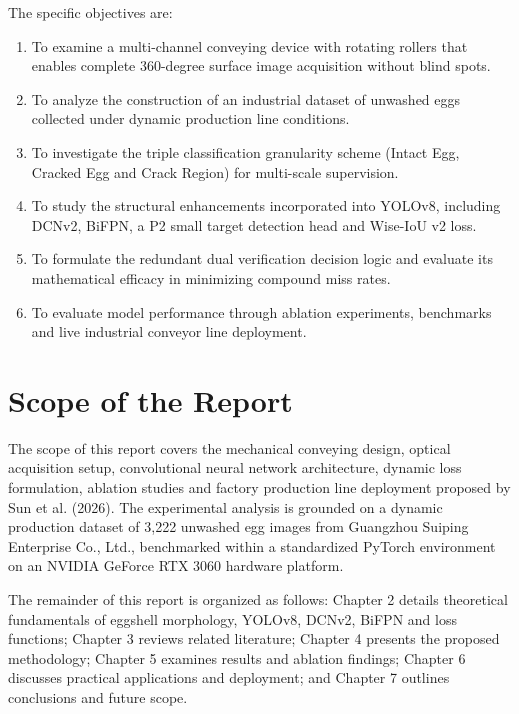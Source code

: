 \documentclass[12pt,a4paper]{report}
\begin{document}
The specific objectives are:
\begin{enumerate}[label=\arabic*.]
    \item To examine a multi-channel conveying device with rotating rollers that enables complete 360-degree surface image acquisition without blind spots.
    \item To analyze the construction of an industrial dataset of unwashed eggs collected under dynamic production line conditions.
    \item To investigate the triple classification granularity scheme (Intact Egg, Cracked Egg and Crack Region) for multi-scale supervision.
    \item To study the structural enhancements incorporated into YOLOv8, including DCNv2, BiFPN, a P2 small target detection head and Wise-IoU v2 loss.
    \item To formulate the redundant dual verification decision logic and evaluate its mathematical efficacy in minimizing compound miss rates.
    \item To evaluate model performance through ablation experiments, benchmarks and live industrial conveyor line deployment.
\end{enumerate}

\section{Scope of the Report}

The scope of this report covers the mechanical conveying design, optical acquisition setup, convolutional neural network architecture, dynamic loss formulation, ablation studies and factory production line deployment proposed by Sun et al. (2026). The experimental analysis is grounded on a dynamic production dataset of 3,222 unwashed egg images from Guangzhou Suiping Enterprise Co., Ltd., benchmarked within a standardized PyTorch environment on an NVIDIA GeForce RTX 3060 hardware platform.

The remainder of this report is organized as follows: Chapter 2 details theoretical fundamentals of eggshell morphology, YOLOv8, DCNv2, BiFPN and loss functions; Chapter 3 reviews related literature; Chapter 4 presents the proposed methodology; Chapter 5 examines results and ablation findings; Chapter 6 discusses practical applications and deployment; and Chapter 7 outlines conclusions and future scope.
\end{document}
